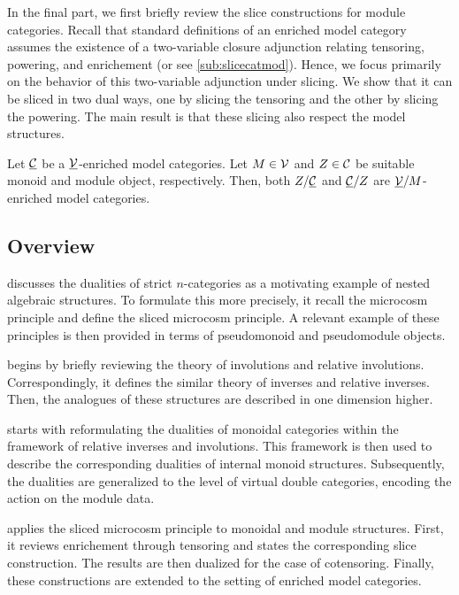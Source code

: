 In the final part, we first briefly review the slice constructions for module categories. Recall that standard definitions of an enriched model category assumes the existence of a two-variable closure adjunction relating tensoring, powering, and enrichement \cite{hovey2007modelcat} (or see \cref{sub:slicecatmod}). Hence, we focus primarily on the behavior of this two-variable adjunction under slicing. We show that it can be sliced in two dual ways, one by slicing the tensoring and the other by slicing the powering. The main result is that these slicing also respect the model structures.

\begin{theorem*}
	Let $\underline{\mathcal{C}}$ be a $\underline{\mathcal{V}}$-enriched model categories. Let $M\in \mathcal{V}$ and $Z \in \mathcal{C}$ be suitable monoid and module object, respectively. Then, both $Z/\underline{\mathcal{C}}$ and $\underline{\mathcal{C}}/Z$ are $\underline{\mathcal{V}}/M$-enriched model categories.
\end{theorem*}

\subsection{Overview}

 discusses the dualities of strict $n$-categories as a motivating example of nested algebraic structures. To formulate this more precisely, it recall the microcosm principle and define the sliced microcosm principle. A relevant example of these principles is then provided in terms of pseudomonoid and pseudomodule objects.

 begins by briefly reviewing the theory of involutions and relative involutions. Correspondingly, it defines the similar theory of inverses and relative inverses. Then, the analogues of these structures are described in one dimension higher. 

 starts with reformulating the dualities of monoidal categories within the framework of relative inverses and involutions. This framework is then used to describe the corresponding dualities of internal monoid structures. Subsequently,  the dualities are generalized to the level of virtual double categories, encoding the action on the module data.

 applies the sliced microcosm principle to monoidal and module structures. First, it reviews enrichement through tensoring and states the corresponding slice construction. The results are then dualized for the case of cotensoring. Finally, these constructions are extended to the setting of enriched model categories. 